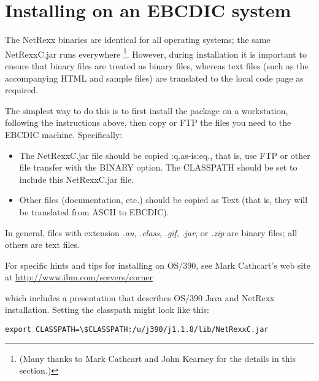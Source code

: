 \chapter{Installing on an EBCDIC system}




The NetRexx binaries are identical for all operating systems; the same
NetRexxC.jar runs everywhere \footnote{(Many thanks to Mark Cathcart
  and John Kearney for the details in this section.)}.
However, during installation it is important to ensure that binary files
are treated as binary files, whereas text files (such as the
accompanying HTML and sample files) are translated to the local code
page as required.

The simplest way to do this is to first install the package on a
workstation, following the instructions above, then copy or FTP the
files you need to the EBCDIC machine.  Specifically:
\begin{itemize}
\item The NetRexxC.jar file should be copied :q.as-is:eq., that is, use
FTP or other file transfer with the BINARY option.  The CLASSPATH should
be set to include this NetRexxC.jar file.
\item Other files (documentation, etc.) should be copied as Text (that is,
they will be translated from ASCII to EBCDIC).
\end{itemize}

In general, files with extension \emph{.au}, \emph{.class}, \emph{.gif}, \emph{.jar},
or \emph{.zip} are binary files; all others are text files.

For specific hints and tips for installing on OS/390, see Mark
Cathcart's web site at \url{http://www.ibm.com/servers/corner}

which includes a presentation that describes OS/390 Java and NetRexx
installation.  Setting the classpath might look like this:
\begin{verbatim}
export CLASSPATH=\$CLASSPATH:/u/j390/j1.1.8/lib/NetRexxC.jar
\end{verbatim}
